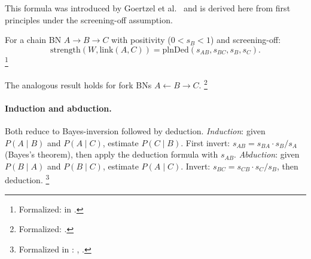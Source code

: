\documentclass[11pt,openany]{report}
\begin{document}
\noindent
This formula was introduced by Goertzel et
al.~\cite{goertzel2009pln} and is derived here from first principles
under the screening-off assumption.

\begin{theorem}
\label{thm:chain-deduction}
For a chain BN $A \to B \to C$ with positivity ($0 < s_B < 1$) and
screening-off:
\[
  \mathrm{strength}(W, \mathrm{link}(A, C)) =
  \mathrm{plnDed}(s_{AB}, s_{BC}, s_B, s_C).
\]%
\footnote{Formalized: 
in .}
\end{theorem}

\noindent
The analogous result holds for fork BNs
$A \leftarrow B \to C$.%
\footnote{Formalized:
.}

\paragraph{Induction and abduction.}
Both reduce to Bayes-inversion followed by deduction.
\emph{Induction}: given $P(A \mid B)$ and $P(A \mid C)$, estimate
$P(C \mid B)$.  First invert:
$s_{AB} = s_{BA} \cdot s_B / s_A$ (Bayes's theorem), then apply
the deduction formula with $s_{AB}$.
\emph{Abduction}: given $P(B \mid A)$ and $P(B \mid C)$, estimate
$P(A \mid C)$.  Invert:
$s_{BC} = s_{CB} \cdot s_C / s_B$, then deduction.%
\footnote{Formalized in
:
,
.}
\end{document}
